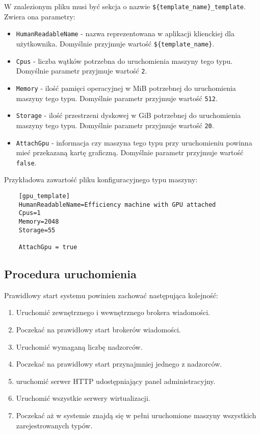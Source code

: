 \documentclass[../opis-rozwiazania.tex]{subfiles}
\begin{document}
W znalezionym pliku musi być sekcja o nazwie \texttt{\$\{template\_name\}\_template}.
Zwiera ona parametry:
\begin{itemize}
	\item \texttt{HumanReadableName} - nazwa reprezentowana w aplikacji klienckiej dla użytkownika. Domyślnie przyjmuje wartość \texttt{\$\{template\_name\}}.
	\item \texttt{Cpus} - liczba wątków potrzebna do uruchomienia maszyny tego typu. Domyślnie parametr przyjmuje wartość \texttt{2}.
	\item \texttt{Memory} - ilość pamięci operacyjnej w MiB potrzebnej do uruchomienia maszyny tego typu. Domyślnie parametr przyjmuje wartość \texttt{512}.
	\item \texttt{Storage} - ilość przestrzeni dyskowej w GiB potrzebnej do uruchomienia maszyny tego typu. Domyślnie parametr przyjmuje wartość \texttt{20}.
	\item \texttt{AttachGpu} - informacja czy maszyna tego typu przy uruchomieniu powinna mieć przekazaną kartę graficzną. Domyślnie parametr przyjmuje wartość \texttt{false}.
\end{itemize}

Przykładowa zawartość pliku konfiguracyjnego typu maszyny:

\begin{verbatim}
	[gpu_template]
	HumanReadableName=Efficiency machine with GPU attached
	Cpus=1
	Memory=2048
	Storage=55

	AttachGpu = true
\end{verbatim}

\subsection{Procedura uruchomienia}
\label{system_startup.procedure}
Prawidłowy start systemu powinien zachować następująca kolejność:
\begin{enumerate}
	\item Uruchomić zewnętrznego i wewnętrznego brokera wiadomości.
	\item Poczekać na prawidłowy start brokerów wiadomości.
	\item Uruchomić wymaganą liczbę nadzorców.
	\item Poczekać na prawidłowy start przynajmniej jednego z nadzorców.
	\item uruchomić serwer HTTP udostępniający panel administracyjny.
	\item Uruchomić wszystkie serwery wirtualizacji.
	\item Poczekać aż w systemie znajdą się w pełni uruchomione maszyny wszystkich zarejestrowanych typów.
\end{enumerate}
\end{document}

